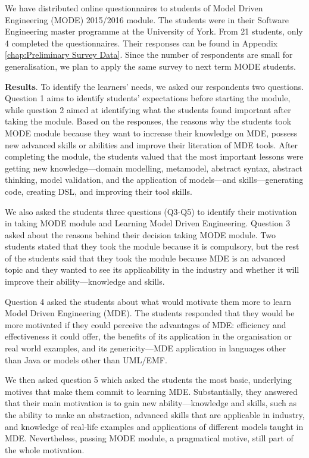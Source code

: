 \documentclass[12pt, a4paper]{report}
\begin{document}
{We have distributed online questionnaires to students of Model Driven Engineering (MODE) 2015/2016 module. The students were in their Software Engineering master programme at the University of York. From 21 students, only 4 completed the questionnaires. Their responses can be found in Appendix \autoref{chap:Preliminary Survey Data}.  Since the number of respondents are small for generalisation, we plan to apply the same survey to next term MODE students. 

\textbf{Results}. To identify the learners' needs, we asked our respondents two questions. Question 1 aims to identify students' expectations before starting the module, while question 2 aimed at identifying what the students found important after taking the module. Based on the responses, the reasons why the students took MODE module because they want to increase their knowledge on MDE, possess new advanced skills or abilities and improve their literation of MDE tools. After completing the module, the students valued that the most important lessons were getting new knowledge---domain modelling, metamodel, abstract syntax, abstract thinking, model validation, and the application of models---and skills---generating code, creating DSL, and improving their tool skills. 

We also asked the students three questions (Q3-Q5) to identify their motivation in taking MODE module and Learning Model Driven Engineering. Question 3 asked about the reasons behind their decision taking MODE module. Two students stated that they took the module because it is compulsory, but the rest of the students said that they took the module because MDE is an advanced topic and they wanted to see its applicability in the industry and whether it will improve their ability---knowledge and skills. 

Question 4 asked the students about what would motivate them more to learn Model Driven Engineering (MDE). The students responded that they would be more motivated if they could perceive the advantages of MDE: efficiency and effectiveness it could offer, the benefits of its application in the organisation or real world examples, and its genericity---MDE application in languages other than Java or models other than UML/EMF.

We then asked question 5 which asked the students the most basic, underlying motives that make them commit to learning MDE. Substantially, they answered that their main motivation is to gain new ability---knowledge and skills, such as the ability to make an abstraction, advanced skills that are applicable in industry, and knowledge of real-life examples and applications of different models taught in MDE. Nevertheless, passing MODE module, a pragmatical motive, still part of the whole motivation. 

}
\end{document}
